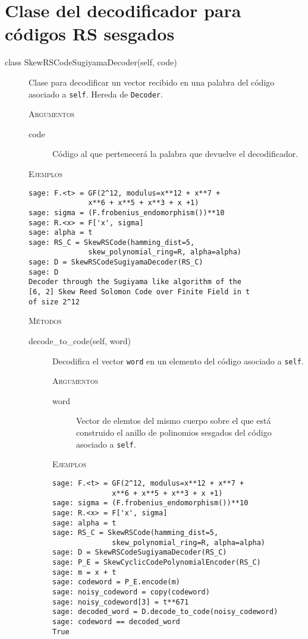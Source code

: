\section{Clase del decodificador para códigos RS sesgados}
\begin{description}
    \item[class SkewRSCodeSugiyamaDecoder(self, code)]
    Clase para decodificar un vector recibido en una palabra del código asociado a \texttt{self}. Hereda de \texttt{Decoder}.

    \textsc{Argumentos}
    \begin{description}
        \item[code]
        Código al que pertenecerá la palabra que devuelve el decodificador.
    \end{description}

    \textsc{Ejemplos}
    \begin{lstlisting}
sage: F.<t> = GF(2^12, modulus=x**12 + x**7 +
              x**6 + x**5 + x**3 + x +1)
sage: sigma = (F.frobenius_endomorphism())**10
sage: R.<x> = F['x', sigma]
sage: alpha = t
sage: RS_C = SkewRSCode(hamming_dist=5,
              skew_polynomial_ring=R, alpha=alpha)
sage: D = SkewRSCodeSugiyamaDecoder(RS_C)
sage: D
Decoder through the Sugiyama like algorithm of the
[6, 2] Skew Reed Solomon Code over Finite Field in t
of size 2^12
    \end{lstlisting}

    \textsc{Métodos}
    \begin{description}
        \item[decode\_to\_code(self, word)]
        Decodifica el vector \texttt{word} en un elemento del código asociado a \texttt{self}.

        \textsc{Argumentos}
        \begin{description}
            \item[word]
            Vector de elemtos del mismo cuerpo sobre el que está construido el anillo de polinomios
            sesgados del código asociado a \texttt{self}.
        \end{description}

        \textsc{Ejemplos}
        \begin{lstlisting}
sage: F.<t> = GF(2^12, modulus=x**12 + x**7 +
              x**6 + x**5 + x**3 + x +1)
sage: sigma = (F.frobenius_endomorphism())**10
sage: R.<x> = F['x', sigma]
sage: alpha = t
sage: RS_C = SkewRSCode(hamming_dist=5,
              skew_polynomial_ring=R, alpha=alpha)
sage: D = SkewRSCodeSugiyamaDecoder(RS_C)
sage: P_E = SkewCyclicCodePolynomialEncoder(RS_C)
sage: m = x + t
sage: codeword = P_E.encode(m)
sage: noisy_codeword = copy(codeword)
sage: noisy_codeword[3] = t**671
sage: decoded_word = D.decode_to_code(noisy_codeword)
sage: codeword == decoded_word
True
        \end{lstlisting}


\end{description}
\end{description}
